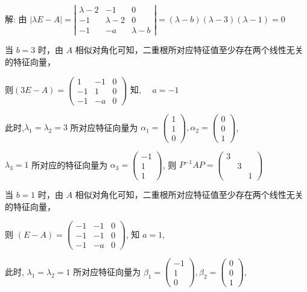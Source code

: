 \documentclass{article}
\begin{document}
解: 由 $|\lambda E-A|=\left|\begin{array}{ccc}\lambda-2 & -1 & 0 \\ -1 & \lambda-2 & 0 \\ -1 & -a & \lambda-b\end{array}\right|=(\lambda-b)(\lambda-3)(\lambda-1)=0$

当 $b=3$ 时，由 $A$ 相似对角化可知，二重根所对应特征值至少存在两个线性无关的特征向量，

则$(3 E-A)=\left(\begin{array}{ccc}1 & -1 & 0 \\ -1 & 1 & 0 \\ -1 & -a & 0\end{array}\right)$ 知, $\quad a=-1$

此时,$\lambda_{1}=\lambda_{2}=3$ 所对应特征向量为 $\alpha_{1}=\left(\begin{array}{l}1 \\ 1 \\ 0\end{array}\right), \alpha_{2}=\left(\begin{array}{l}0 \\ 0 \\ 1\end{array}\right)$,

$\lambda_{3}=1$ 所对应的特征向量为 $\alpha_{3}=\left(\begin{array}{c}-1 \\ 1 \\ 1\end{array}\right)$, 则 $P^{-1} A P=\left(\begin{array}{lll}3 & & \\ & 3 & \\ & & 1\end{array}\right)$

当 $b=1$ 时，由 $A$ 相似对角化可知，二重根所对应特征值至少存在两个线性无关的特征向量，

则 $(E-A)=\left(\begin{array}{rrr}-1 & -1 & 0 \\ -1 & -1 & 0 \\ -1 & -a & 0\end{array}\right)$, 知 $a=1$,

此时, $\lambda_{1}=\lambda_{2}=1$ 所对应特征向量为 $\beta_{1}=\left(\begin{array}{c}-1 \\ 1 \\ 0\end{array}\right), \beta_{2}=\left(\begin{array}{l}0 \\ 0 \\ 1\end{array}\right)$,
\end{document}
